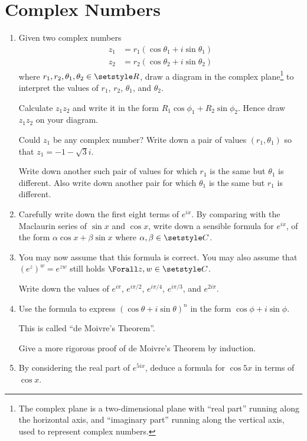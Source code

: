 \section{Complex Numbers}

\begin{enumerate}
 \item
  Given two complex numbers
  \begin{align*}
   z_1 &= r_1(\cos \theta_1 + i \sin \theta_1) \\
   z_2 &= r_2(\cos \theta_2 + i \sin \theta_2)
  \end{align*}
  where \(r_1, r_2, \theta_1, \theta_2 \in \Reals\), draw a diagram in the
  complex plane\footnote{
   The complex plane is a two-dimensional plane with ``real part'' running along
   the horizontal axis, and ``imaginary part'' running along the vertical axis,
   used to represent complex numbers.
  } to interpret the values of
  \(r_1\), \(r_2\), \(\theta_1\), and \(\theta_2\).

  Calculate \(z_1 z_2\) and write it in the form
  \(R_1 \cos \phi_1 + R_2 \sin \phi_2\). Hence draw \(z_1 z_2\) on your diagram.

  Could \(z_1\) be any complex number? Write down a pair of values
  \((r_1, \theta_1)\) so that \(z_1 = -1 - \sqrt 3i\).

  Write down another such pair of values for which \(r_1\) is the same but
  \(\theta_1\) is different. Also write down another pair for which
  \(\theta_1\) is the same but \(r_1\) is different.
 \item
  Carefully write down the first eight terms of \(e^{ix}\). By comparing with
  the Maclaurin series of \(\sin x\) and \(\cos x\), write down a sensible
  formula for \(e^{ix}\), of the form \(\alpha \cos x + \beta \sin x\) where
  \(\alpha, \beta \in \Complex\).
 \item
  You may now assume that this formula is correct. You may also assume that
  \((e^z)^w = e^{zw}\) still holds \(\Forall z, w \in \Complex\).

  Write down the values of \(e^{i\pi}\), \(e^{i\pi / 2}\),
  \(e^{i\pi / 4}\), \(e^{i\pi / 3}\), and \(e^{2 i \pi}\).
 \item
  Use the formula to express
  \((\cos \theta + i \sin \theta)^n\) in the form \(\cos \phi + i \sin \phi\).

  This is called ``de Moivre's Theorem''.

  Give a more rigorous proof of de Moivre's Theorem by induction.
 \item
  By considering the real part of
  \(e^{5ix}\), deduce a formula for \(\cos 5x\) in terms of \(\cos x\).


\end{enumerate}
